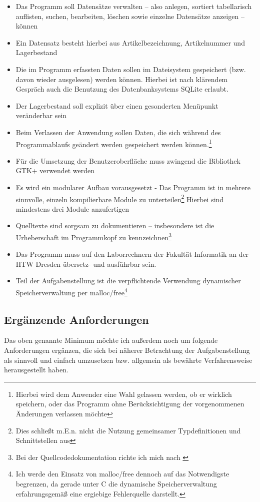 \begin{itemize}
\item Das Programm soll Datensätze verwalten -- also anlegen, sortiert tabellarisch auflisten, suchen, bearbeiten,
löschen sowie einzelne Datensätze anzeigen -- können
\item Ein Datensatz besteht hierbei aus Artikelbezeichnung, Artikelnummer und Lagerbestand
\item Die im Programm erfassten Daten sollen im Dateisystem gespeichert (bzw. davon wieder ausgelesen) werden können.
Hierbei ist nach klärendem Gespräch auch die Benutzung des Datenbanksystems SQLite erlaubt.
\item Der Lagerbestand soll explizit über einen gesonderten Menüpunkt veränderbar sein
\item Beim Verlassen der Anwendung sollen Daten, die sich während des Programmablaufs geändert werden
gespeichert werden können.\footnote{Hierbei wird dem Anwender eine Wahl gelassen werden, ob er wirklich speichern, oder
das Programm ohne Berücksichtigung der vorgenommenen Änderungen verlassen möchte}
\item Für die Umsetzung der Benutzeroberfläche muss zwingend die Bibliothek GTK+ verwendet werden
\item Es wird ein modularer Aufbau vorausgesetzt - Das Programm ist in mehrere sinnvolle, einzeln kompilierbare Module
zu unterteilen\footnote{Dies schließt m.E.n. nicht die Nutzung gemeinsamer Typdefinitionen und Schnittstellen aus}
Hierbei sind mindestens drei Module anzufertigen
\item Quelltexte sind sorgsam zu dokumentieren -- insbesondere ist die Urheberschaft im Programmkopf zu
kennzeichnen\footnote{Bei der Quellcodedokumentation richte ich mich nach \cite[Kap.4]{Martin:CleanCode}}
\item Das Programm muss auf den Laborrechnern der Fakultät Informatik an der HTW Dresden übersetz- und ausführbar sein.
\item Teil der Aufgabenstellung ist die verpflichtende Verwendung dynamischer Speicherverwaltung per malloc/free\footnote{
Ich werde den Einsatz von malloc/free dennoch auf das Notwendigste begrenzen, da gerade unter C die dynamische
Speicherverwaltung erfahrungsgemäß eine ergiebige Fehlerquelle darstellt.}
\end{itemize}

\subsection{Ergänzende Anforderungen}
Das oben genannte Minimum möchte ich außerdem noch um folgende Anforderungen ergänzen, die sich bei näherer Betrachtung
der Aufgabenstellung als sinnvoll und einfach umzusetzen bzw. allgemein als bewährte Verfahrensweise herausgestellt haben.


